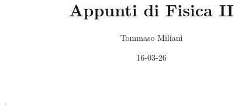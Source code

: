 \documentclass[a4paper, oneside]{article}
\title{Appunti di Fisica II}
\author{Tommaso Miliani}
\date{16-03-26}
\begin{document}
                {}          %
                {}          %
                {\slshape}  %
                {}          %
                {\bfseries} %
                {.}         %
                {\newline}  %
                {}          %
\theoremstyle{theoremEnv}

\newtheorem{definition}{Definizione}[section]
\newtheorem{theorem}{Teorema}[section]
\newtheorem{lemma}{Proposizione}[section]
\newtheorem{observation}{Osservazione}[section]
\newtheorem{corollary}{Corollario}[theorem]
\newtheorem{example}{Esempio}[section]
\newtheorem{remark}{Enunciato}[section]

\maketitle
\end{document}
